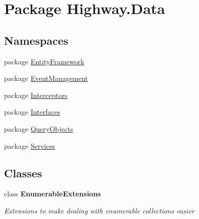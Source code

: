 \hypertarget{namespace_highway_1_1_data}{\section{Package Highway.\-Data}
\label{namespace_highway_1_1_data}
}
\subsection*{Namespaces}
\begin{DoxyCompactItemize}
\item 
package \hyperlink{namespace_highway_1_1_data_1_1_entity_framework}{Entity\-Framework}
\item 
package \hyperlink{namespace_highway_1_1_data_1_1_event_management}{Event\-Management}
\item 
package \hyperlink{namespace_highway_1_1_data_1_1_interceptors}{Interceptors}
\item 
package \hyperlink{namespace_highway_1_1_data_1_1_interfaces}{Interfaces}
\item 
package \hyperlink{namespace_highway_1_1_data_1_1_query_objects}{Query\-Objects}
\item 
package \hyperlink{namespace_highway_1_1_data_1_1_services}{Services}
\end{DoxyCompactItemize}
\subsection*{Classes}
\begin{DoxyCompactItemize}
\item 
class {\bfseries Enumerable\-Extensions}
\begin{DoxyCompactList}\small\item\em Extensions to make dealing with enumerable collections easier \end{DoxyCompactList}\end{DoxyCompactItemize}
